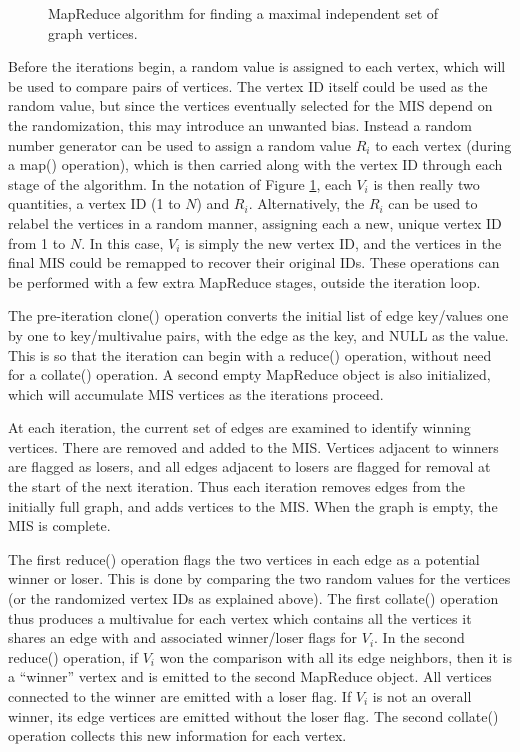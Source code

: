\begin{figure}[htb]
\begin{center}
{\begin{minipage}{\textwidth}
\begin{tabbing}
  \end{tabbing}
 \end{minipage}}\end{center}

 \caption{MapReduce algorithm for finding a maximal independent set of
 graph vertices.}

 \label{fig:luby}
\end{figure}

Before the iterations begin, a random value is assigned to each
vertex, which will be used to compare pairs of vertices.  The vertex
ID itself could be used as the random value, but since the vertices
eventually selected for the MIS depend on the randomization, this may
introduce an unwanted bias.  Instead a random number generator can be
used to assign a random value $R_i$ to each vertex (during a map()
operation), which is then carried along with the vertex ID through
each stage of the algorithm.  In the notation of Figure
\ref{fig:luby}, each $V_i$ is then really two quantities, a vertex ID
(1 to $N$) and $R_i$.  Alternatively, the $R_i$ can be used to relabel
the vertices in a random manner, assigning each a new, unique vertex
ID from 1 to $N$.  In this case, $V_i$ is simply the new vertex ID,
and the vertices in the final MIS could be remapped to recover their
original IDs.  These operations can be performed with a few extra
MapReduce stages, outside the iteration loop.

The pre-iteration clone() operation converts the initial list of edge
key/values one by one to key/multivalue pairs, with the edge as the
key, and NULL as the value.  This is so that the iteration can begin
with a reduce() operation, without need for a collate() operation.  A
second empty MapReduce object is also initialized, which will
accumulate MIS vertices as the iterations proceed.

At each iteration, the current set of edges are examined to identify
winning vertices.  There are removed and added to the MIS.  Vertices
adjacent to winners are flagged as losers, and all edges adjacent to
losers are flagged for removal at the start of the next iteration.
Thus each iteration removes edges from the initially full graph, and
adds vertices to the MIS.  When the graph is empty, the MIS is
complete.

The first reduce() operation flags the two vertices in each edge as a
potential winner or loser.  This is done by comparing the two random
values for the vertices (or the randomized vertex IDs as explained
above).  The first collate() operation thus produces a multivalue for
each vertex which contains all the vertices it shares an edge with and
associated winner/loser flags for $V_i$.  In the second reduce()
operation, if $V_i$ won the comparison with all its edge neighbors,
then it is a ``winner'' vertex and is emitted to the second MapReduce
object.  All vertices connected to the winner are emitted with a loser
flag.  If $V_i$ is not an overall winner, its edge vertices are
emitted without the loser flag.  The second collate() operation
collects this new information for each vertex.

